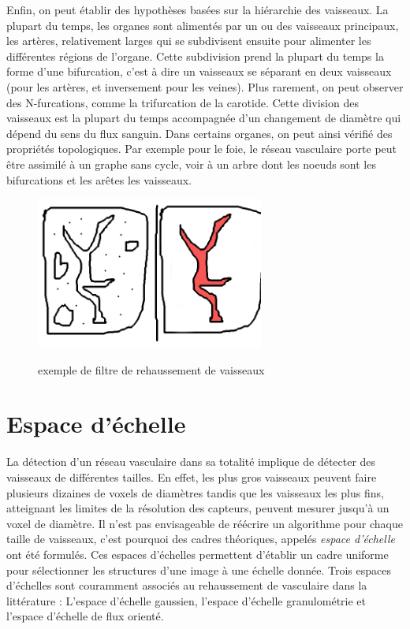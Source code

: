 Enfin, on peut établir des hypothèses basées sur la hiérarchie des vaisseaux. La plupart du temps, les organes sont alimentés par un ou des vaisseaux principaux, les artères, relativement larges qui se subdivisent ensuite pour alimenter les différentes régions de l'organe. Cette subdivision prend la plupart du temps la forme d'une bifurcation, c'est à dire un vaisseaux se séparant en deux vaisseaux (pour les artères, et inversement pour les veines). Plus rarement, on peut observer des N-furcations, comme la trifurcation de la carotide. Cette division des vaisseaux est la plupart du temps accompagnée d'un changement de diamètre qui dépend du sens du flux sanguin. Dans certains organes, on peut ainsi vérifié des propriétés topologiques. Par exemple pour le foie, le réseau vasculaire porte peut être assimilé à un graphe sans cycle, voir à un arbre dont les noeuds sont les bifurcations et les arêtes les vaisseaux.

\begin{figure}
  \centering
  \includegraphics[height=5cm]{Images/example_enhancement.png}
  \label{fig:exemple_vesselness}
  \caption{exemple de filtre de rehaussement de vaisseaux}
\end{figure}

\section{Espace d'échelle}
\label{sec:EA:rehaussement:echelle}


La détection d'un réseau vasculaire dans sa totalité implique de détecter des vaisseaux de différentes tailles. En effet, les plus gros vaisseaux peuvent faire plusieurs dizaines de voxels de diamètres tandis que les vaisseaux les plus fins, atteignant les limites de la résolution des capteurs, peuvent  mesurer jusqu'à un voxel de diamètre. Il n'est pas envisageable de réécrire un algorithme pour chaque taille de vaisseaux, c'est pourquoi des cadres théoriques, appelés \emph{espace d'échelle} ont été formulés. Ces espaces d'échelles permettent d'établir un cadre uniforme pour sélectionner les structures d'une image à une échelle donnée. Trois espaces d'échelles sont couramment associés au rehaussement de vasculaire dans la littérature : L'espace d'échelle gaussien, l'espace d'échelle granulométrie et l'espace d'échelle de flux orienté.

